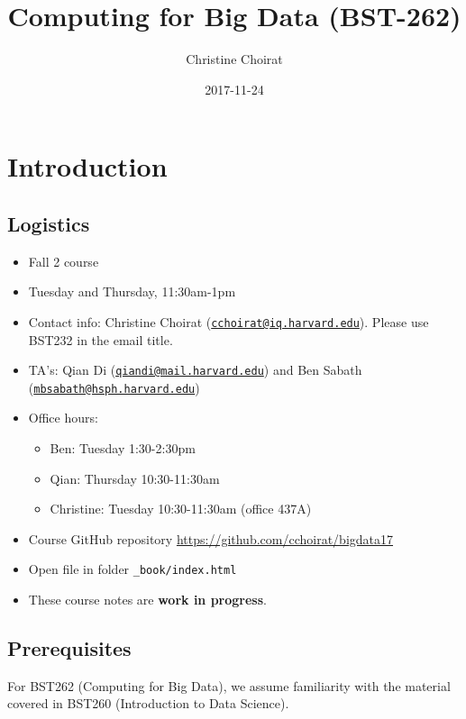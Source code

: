 \documentclass[]{book}
\title{Computing for Big Data (BST-262)}
\author{Christine Choirat}
\date{2017-11-24}
\providecommand{\tightlist}{%
  \setlength{\itemsep}{0pt}\setlength{\parskip}{0pt}}
\theoremstyle{definition}
\theoremstyle{definition}
\theoremstyle{definition}
\theoremstyle{remark}
\begin{document}
\maketitle

{
\setcounter{tocdepth}{1}
\tableofcontents
}
\chapter{Introduction}\label{intro}

\section{Logistics}\label{logistics}

\begin{itemize}
\tightlist
\item
  Fall 2 course
\item
  Tuesday and Thursday, 11:30am-1pm
\item
  Contact info: Christine Choirat
  (\href{mailto:cchoirat@iq.harvard.edu}{\nolinkurl{cchoirat@iq.harvard.edu}}).
  Please use BST232 in the email title.
\item
  TA's: Qian Di
  (\href{mailto:qiandi@mail.harvard.edu}{\nolinkurl{qiandi@mail.harvard.edu}})
  and Ben Sabath
  (\href{mailto:mbsabath@hsph.harvard.edu}{\nolinkurl{mbsabath@hsph.harvard.edu}})
\item
  Office hours:

  \begin{itemize}
  \tightlist
  \item
    Ben: Tuesday 1:30-2:30pm
  \item
    Qian: Thursday 10:30-11:30am
  \item
    Christine: Tuesday 10:30-11:30am (office 437A)
  \end{itemize}
\item
  Course GitHub repository \url{https://github.com/cchoirat/bigdata17}
\item
  Open file in folder \texttt{\_book/index.html}
\item
  These course notes are \textbf{work in progress}.
\end{itemize}

\section{Prerequisites}\label{prerequisites}

For BST262 (Computing for Big Data), we assume familiarity with the
material covered in BST260 (Introduction to Data Science).
\end{document}
